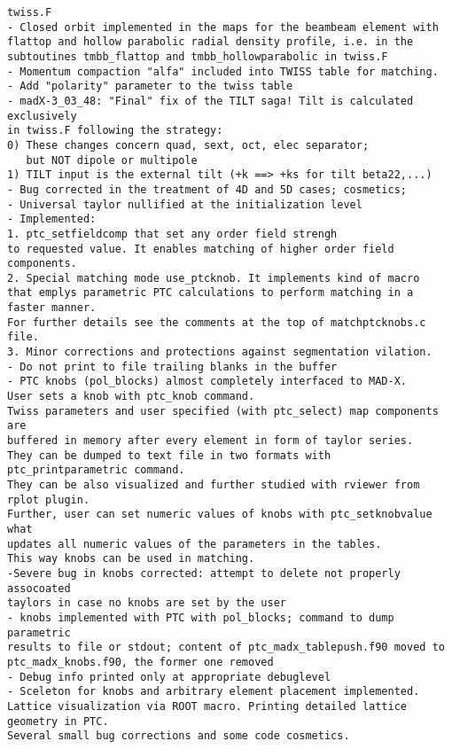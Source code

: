 \begin{verbatim}
twiss.F
- Closed orbit implemented in the maps for the beambeam element with
flattop and hollow parabolic radial density profile, i.e. in the
subtoutines tmbb_flattop and tmbb_hollowparabolic in twiss.F
- Momentum compaction "alfa" included into TWISS table for matching.
- Add "polarity" parameter to the twiss table
- madX-3_03_48: "Final" fix of the TILT saga! Tilt is calculated exclusively
in twiss.F following the strategy:
0) These changes concern quad, sext, oct, elec separator;
   but NOT dipole or multipole
1) TILT input is the external tilt (+k ==> +ks for tilt beta22,...)
- Bug corrected in the treatment of 4D and 5D cases; cosmetics;
- Universal taylor nullified at the initialization level
- Implemented:
1. ptc_setfieldcomp that set any order field strengh
to requested value. It enables matching of higher order field components.
2. Special matching mode use_ptcknob. It implements kind of macro
that emplys parametric PTC calculations to perform matching in a faster manner.
For further details see the comments at the top of matchptcknobs.c file.
3. Minor corrections and protections against segmentation vilation.
- Do not print to file trailing blanks in the buffer
- PTC knobs (pol_blocks) almost completely interfaced to MAD-X.
User sets a knob with ptc_knob command.
Twiss parameters and user specified (with ptc_select) map components are
buffered in memory after every element in form of taylor series.
They can be dumped to text file in two formats with ptc_printparametric command.
They can be also visualized and further studied with rviewer from rplot plugin.
Further, user can set numeric values of knobs with ptc_setknobvalue what
updates all numeric values of the parameters in the tables.
This way knobs can be used in matching.
-Severe bug in knobs corrected: attempt to delete not properly assocoated 
taylors in case no knobs are set by the user
- knobs implemented with PTC with pol_blocks; command to dump parametric 
results to file or stdout; content of ptc_madx_tablepush.f90 moved to 
ptc_madx_knobs.f90, the former one removed
- Debug info printed only at appropriate debuglevel
- Sceleton for knobs and arbitrary element placement implemented. 
Lattice visualization via ROOT macro. Printing detailed lattice geometry in PTC. 
Several small bug corrections and some code cosmetics.


\end{verbatim}
